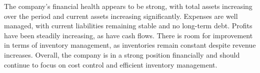 

The company's financial health appears to be strong, with total assets increasing over the period and current assets increasing significantly. Expenses are well managed, with current liabilities remaining stable and no long-term debt. Profits have been steadily increasing, as have cash flows. There is room for improvement in terms of inventory management, as inventories remain constant despite revenue increases. Overall, the company is in a strong position financially and should continue to focus on cost control and efficient inventory management.